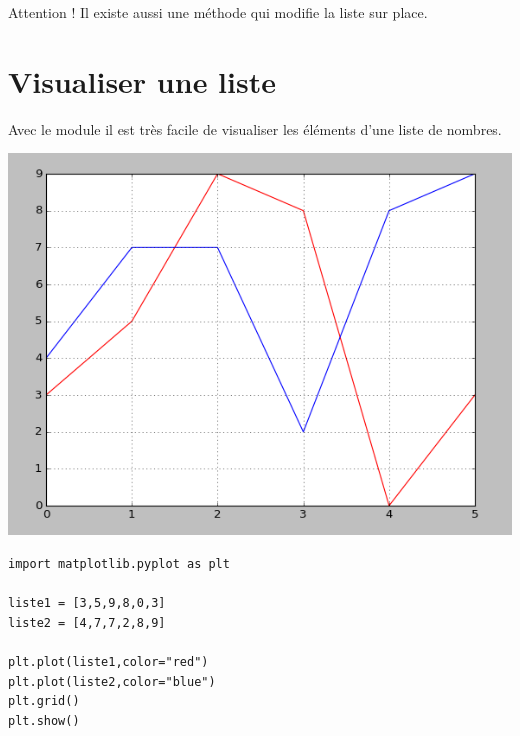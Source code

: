 \documentclass[12pt,class=report,crop=false]{standalone}
\begin{document}
  Attention ! Il existe aussi une méthode  qui modifie la liste sur place.

\newpage

\section*{Visualiser une liste}

Avec le module  il est très facile de visualiser les éléments d'une liste de nombres.

\begin{center}
\includegraphics[scale=0.45]{ecran-liste-cours-visualisation}
\end{center}

\begin{lstlisting}
import matplotlib.pyplot as plt

liste1 = [3,5,9,8,0,3]
liste2 = [4,7,7,2,8,9]

plt.plot(liste1,color="red")
plt.plot(liste2,color="blue")
plt.grid()
plt.show()
\end{lstlisting}


%
%  
%  
%  
%  
%  
\end{document}

